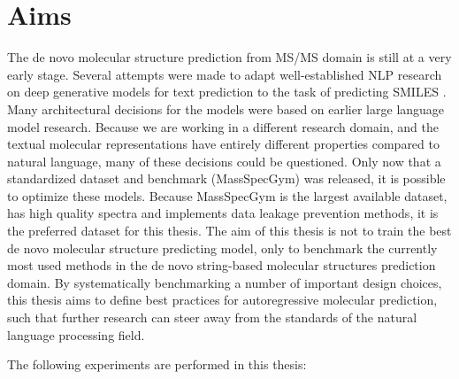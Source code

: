 \chapter{Aims}
\label{chap:aims}

The de novo molecular structure prediction from \ac{MS/MS} domain is still at a very early stage.
Several attempts were made to adapt well-established \ac{NLP} research on deep generative models for text prediction to the task of predicting SMILES \cite{gomez2018automatic, litsa2021spec2mol, stravs2022msnovelist, shrivastava2021massgenie, butler2023ms2mol,bushuiev2024massspecgym}.
Many architectural decisions for the models were based on earlier large language model research.
Because we are working in a different research domain, and the textual molecular representations have entirely different properties compared to natural language,
many of these decisions could be questioned.
Only now that a standardized dataset and benchmark (MassSpecGym) was released, it is possible to optimize these models.
Because MassSpecGym is the largest available dataset, has high quality spectra and implements data leakage prevention methods, it is the preferred dataset for this thesis.
The aim of this thesis is not to train the best de novo molecular structure predicting model,
only to benchmark the currently most used methods in the de novo string-based molecular structures prediction domain.
By systematically benchmarking a number of important design choices, this thesis aims to define best practices for autoregressive molecular prediction,
such that further research can steer away from the standards of the natural language processing field.

The following experiments are performed in this thesis:

